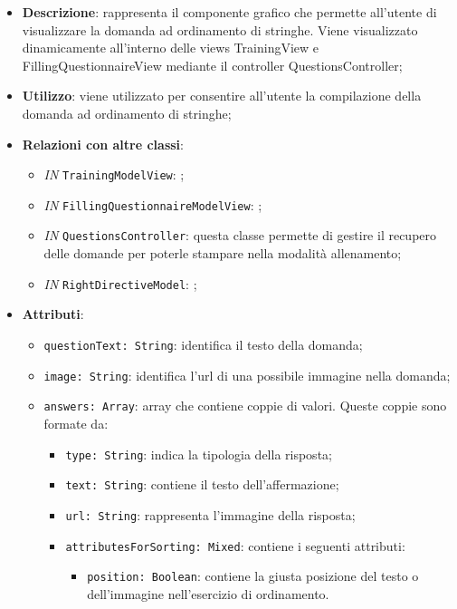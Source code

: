 		\begin{itemize}
			\item \textbf{Descrizione}: rappresenta il componente grafico che permette all'utente di visualizzare la domanda ad ordinamento di stringhe. Viene visualizzato dinamicamente all'interno delle views TrainingView e FillingQuestionnaireView mediante il controller QuestionsController;
			\item \textbf{Utilizzo}: viene utilizzato per consentire all'utente la compilazione della domanda ad ordinamento di stringhe;
			\item \textbf{Relazioni con altre classi}: 
			\begin{itemize}
				\item \textit{IN} \texttt{TrainingModelView}: ; 
				\item \textit{IN} \texttt{FillingQuestionnaireModelView}: ;
				\item \textit{IN} \texttt{QuestionsController}: questa classe permette di gestire il recupero delle domande per poterle stampare nella modalità allenamento;
				\item \textit{IN} \texttt{RightDirectiveModel}: ;
			\end{itemize}
			\item \textbf{Attributi}: 
			\begin{itemize}
				\item \texttt{questionText: String}: identifica il testo della domanda;
				\item \texttt{image: String}: identifica l'url di una possibile immagine nella domanda;
				\item \texttt{answers: Array}: array che contiene coppie di valori. Queste coppie sono formate da:
				\begin{itemize}
					\item \texttt{type: String}: indica la tipologia della risposta;
					\item \texttt{text: String}: contiene il testo dell'affermazione;
					\item \texttt{url: String}: rappresenta l'immagine della risposta;
					\item \texttt{attributesForSorting: Mixed}: contiene i seguenti attributi:
					\begin{itemize}
						\item \texttt{position: Boolean}: contiene la giusta posizione del testo o dell'immagine nell'esercizio di ordinamento.
					\end{itemize}
				\end{itemize}
			\end{itemize}
		\end{itemize}
		
